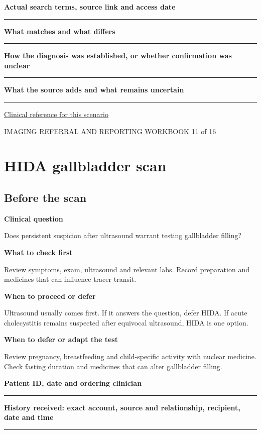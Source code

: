 \documentclass[11pt,a4paper]{article}
\newcommand{\record}[1]{\textbf{#1}\par\vspace{0.55\baselineskip}\hrule\vspace{0.35\baselineskip}}
\begin{document}
\record{Actual search terms, source link and access date}

\record{What matches and what differs}

\record{How the diagnosis was established, or whether confirmation was unclear}

\record{What the source adds and what remains uncertain}

\small\href{https://www.uspreventiveservicestaskforce.org/uspstf/recommendation/osteoporosis-screening}{Clinical reference for this scenario}

\normalsize

\newpage

{\small IMAGING REFERRAL AND REPORTING WORKBOOK \hfill 11 of 16}

\section*{HIDA gallbladder scan}

\subsection*{Before the scan}

\textbf{Clinical question}\par Does persistent suspicion after ultrasound warrant testing gallbladder filling?\par

\textbf{What to check first}\par Review symptoms, exam, ultrasound and relevant labs. Record preparation and medicines that can influence tracer transit.\par

\textbf{When to proceed or defer}\par Ultrasound usually comes first. If it answers the question, defer HIDA. If acute cholecystitis remains suspected after equivocal ultrasound, HIDA is one option.\par

\textbf{When to defer or adapt the test}\par Review pregnancy, breastfeeding and child-specific activity with nuclear medicine. Check fasting duration and medicines that can alter gallbladder filling.\par

\record{Patient ID, date and ordering clinician}

\record{History received: exact account, source and relationship, recipient, date and time}
\end{document}
